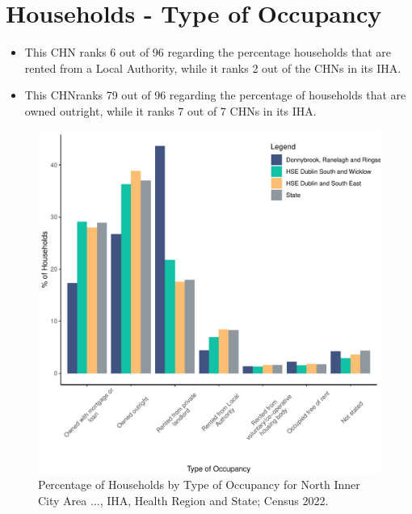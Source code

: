 \documentclass{article}
\begin{document}
\section{Households - Type of Occupancy}\label{sect:Households}
\begin{itemize}
\item This CHN ranks  6 out of 96 regarding the percentage households that are rented from a Local Authority, while it ranks  2 out of the CHNs in its IHA. 
\item This CHNranks  79 out of 96 regarding the percentage of households that are owned outright, while it ranks   7 out of 7 CHNs in its IHA.
\end{itemize}
\begin{figure}[H]
	\centering
	\includegraphics[width = 140mm]{../figures/HouseholdsED.pdf}
	\caption{Percentage of Households by Type of Occupancy for North Inner City Area ..., IHA, Health Region and State; Census 2022.}
	\label{fig:vbnv}
	\end{figure}
\end{document}
